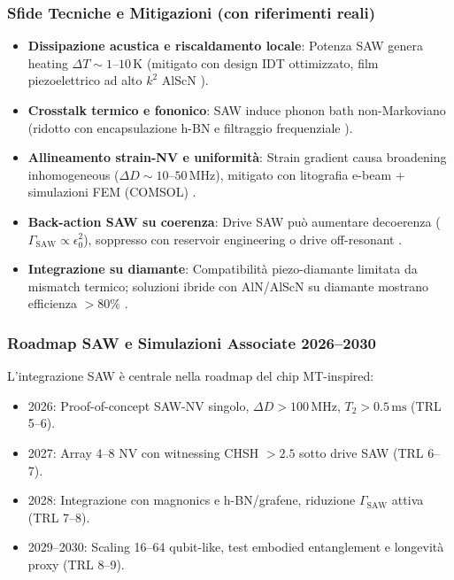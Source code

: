 \documentclass[12pt,a4paper]{article}
\begin{document}
\subsubsection{Sfide Tecniche e Mitigazioni (con riferimenti reali)}

\begin{itemize}
    \item \textbf{Dissipazione acustica e riscaldamento locale}: Potenza SAW genera heating $\Delta T \sim 1$--$10\,\mathrm{K}$ (mitigato con design IDT ottimizzato, film piezoelettrico ad alto $k^2$ AlScN \cite{May2022, Collado2023}).
    
    \item \textbf{Crosstalk termico e fononico}: SAW induce phonon bath non-Markoviano (ridotto con encapsulazione h-BN e filtraggio frequenziale \cite{Whiteley2019, Ku2021, Sangtawesuk2021}).
    
    \item \textbf{Allineamento strain-NV e uniformità}: Strain gradient causa broadening inhomogeneous ($\Delta D \sim 10$--$50\,\mathrm{MHz}$), mitigato con litografia e-beam + simulazioni FEM (COMSOL) \cite{Teissier2020, Barson2018}.
    
    \item \textbf{Back-action SAW su coerenza}: Drive SAW può aumentare decoerenza ($\Gamma_{\mathrm{SAW}} \propto \epsilon_0^2$), soppresso con reservoir engineering o drive off-resonant \cite{Jeske2016, Golter2016}.
    
    \item \textbf{Integrazione su diamante}: Compatibilità piezo-diamante limitata da mismatch termico; soluzioni ibride con AlN/AlScN su diamante mostrano efficienza $>80\%$ \cite{Benito2024, Collado2025}.
\end{itemize}

\subsubsection{Roadmap SAW e Simulazioni Associate 2026--2030}

L'integrazione SAW è centrale nella roadmap del chip MT-inspired:
\begin{itemize}
    \item 2026: Proof-of-concept SAW-NV singolo, $\Delta D > 100\,\mathrm{MHz}$, $T_2 > 0.5\,\mathrm{ms}$ (TRL 5--6).
    \item 2027: Array 4--8 NV con witnessing CHSH $>2.5$ sotto drive SAW (TRL 6--7).
    \item 2028: Integrazione con magnonics e h-BN/grafene, riduzione $\Gamma_{\mathrm{SAW}}$ attiva (TRL 7--8).
    \item 2029--2030: Scaling 16--64 qubit-like, test embodied entanglement e longevità proxy (TRL 8--9).
\end{itemize}
\end{document}
